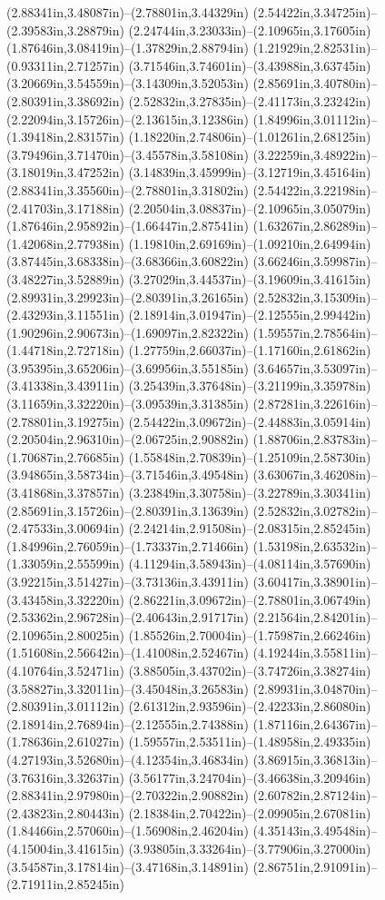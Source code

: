(2.88341in,3.48087in)--(2.78801in,3.44329in) (2.54422in,3.34725in)--(2.39583in,3.28879in) (2.24744in,3.23033in)--(2.10965in,3.17605in) (1.87646in,3.08419in)--(1.37829in,2.88794in) (1.21929in,2.82531in)--(0.93311in,2.71257in) (3.71546in,3.74601in)--(3.43988in,3.63745in) (3.20669in,3.54559in)--(3.14309in,3.52053in) (2.85691in,3.40780in)--(2.80391in,3.38692in) (2.52832in,3.27835in)--(2.41173in,3.23242in) (2.22094in,3.15726in)--(2.13615in,3.12386in) (1.84996in,3.01112in)--(1.39418in,2.83157in) (1.18220in,2.74806in)--(1.01261in,2.68125in) (3.79496in,3.71470in)--(3.45578in,3.58108in) (3.22259in,3.48922in)--(3.18019in,3.47252in) (3.14839in,3.45999in)--(3.12719in,3.45164in) (2.88341in,3.35560in)--(2.78801in,3.31802in) (2.54422in,3.22198in)--(2.41703in,3.17188in) (2.20504in,3.08837in)--(2.10965in,3.05079in) (1.87646in,2.95892in)--(1.66447in,2.87541in) (1.63267in,2.86289in)--(1.42068in,2.77938in) (1.19810in,2.69169in)--(1.09210in,2.64994in) (3.87445in,3.68338in)--(3.68366in,3.60822in) (3.66246in,3.59987in)--(3.48227in,3.52889in) (3.27029in,3.44537in)--(3.19609in,3.41615in) (2.89931in,3.29923in)--(2.80391in,3.26165in) (2.52832in,3.15309in)--(2.43293in,3.11551in) (2.18914in,3.01947in)--(2.12555in,2.99442in) (1.90296in,2.90673in)--(1.69097in,2.82322in) (1.59557in,2.78564in)--(1.44718in,2.72718in) (1.27759in,2.66037in)--(1.17160in,2.61862in) (3.95395in,3.65206in)--(3.69956in,3.55185in) (3.64657in,3.53097in)--(3.41338in,3.43911in) (3.25439in,3.37648in)--(3.21199in,3.35978in) (3.11659in,3.32220in)--(3.09539in,3.31385in) (2.87281in,3.22616in)--(2.78801in,3.19275in) (2.54422in,3.09672in)--(2.44883in,3.05914in) (2.20504in,2.96310in)--(2.06725in,2.90882in) (1.88706in,2.83783in)--(1.70687in,2.76685in) (1.55848in,2.70839in)--(1.25109in,2.58730in) (3.94865in,3.58734in)--(3.71546in,3.49548in) (3.63067in,3.46208in)--(3.41868in,3.37857in) (3.23849in,3.30758in)--(3.22789in,3.30341in) (2.85691in,3.15726in)--(2.80391in,3.13639in) (2.52832in,3.02782in)--(2.47533in,3.00694in) (2.24214in,2.91508in)--(2.08315in,2.85245in) (1.84996in,2.76059in)--(1.73337in,2.71466in) (1.53198in,2.63532in)--(1.33059in,2.55599in) (4.11294in,3.58943in)--(4.08114in,3.57690in) (3.92215in,3.51427in)--(3.73136in,3.43911in) (3.60417in,3.38901in)--(3.43458in,3.32220in) (2.86221in,3.09672in)--(2.78801in,3.06749in) (2.53362in,2.96728in)--(2.40643in,2.91717in) (2.21564in,2.84201in)--(2.10965in,2.80025in) (1.85526in,2.70004in)--(1.75987in,2.66246in) (1.51608in,2.56642in)--(1.41008in,2.52467in) (4.19244in,3.55811in)--(4.10764in,3.52471in) (3.88505in,3.43702in)--(3.74726in,3.38274in) (3.58827in,3.32011in)--(3.45048in,3.26583in) (2.89931in,3.04870in)--(2.80391in,3.01112in) (2.61312in,2.93596in)--(2.42233in,2.86080in) (2.18914in,2.76894in)--(2.12555in,2.74388in) (1.87116in,2.64367in)--(1.78636in,2.61027in) (1.59557in,2.53511in)--(1.48958in,2.49335in) (4.27193in,3.52680in)--(4.12354in,3.46834in) (3.86915in,3.36813in)--(3.76316in,3.32637in) (3.56177in,3.24704in)--(3.46638in,3.20946in) (2.88341in,2.97980in)--(2.70322in,2.90882in) (2.60782in,2.87124in)--(2.43823in,2.80443in) (2.18384in,2.70422in)--(2.09905in,2.67081in) (1.84466in,2.57060in)--(1.56908in,2.46204in) (4.35143in,3.49548in)--(4.15004in,3.41615in) (3.93805in,3.33264in)--(3.77906in,3.27000in) (3.54587in,3.17814in)--(3.47168in,3.14891in) (2.86751in,2.91091in)--(2.71911in,2.85245in) 